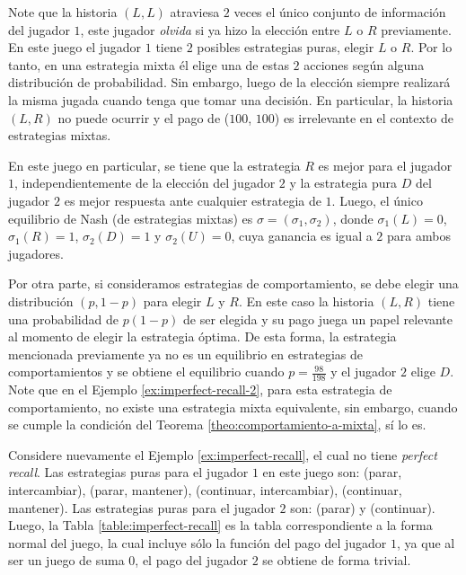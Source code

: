 Note que la historia $(L, L)$ atraviesa $2$ veces el único conjunto de información del jugador $1$, este jugador \textit{olvida} si ya hizo la elección entre $L$ o $R$ previamente. En este juego el jugador $1$ tiene $2$ posibles estrategias puras, elegir $L$ o $R$. Por lo tanto, en una estrategia mixta él elige una de estas $2$ acciones según alguna distribución de probabilidad. Sin embargo, luego de la elección siempre realizará la misma jugada cuando tenga que tomar una decisión. En particular, la historia $(L, R)$ no puede ocurrir y el pago de ($100$, $100$) es irrelevante en el contexto de estrategias mixtas.

En este juego en particular, se tiene que la estrategia $R$ es mejor para el jugador $1$, independientemente de la elección del jugador $2$ y la estrategia pura $D$ del jugador $2$ es mejor respuesta ante cualquier estrategia de $1$. Luego, el único equilibrio de Nash (de estrategias mixtas) es $ \sigma = (\sigma_1, \sigma_2)$, donde $\sigma_1(L) = 0$, $\sigma_1(R) = 1$, $\sigma_2(D) = 1$ y $\sigma_2(U) = 0$, cuya ganancia es igual a $2$ para ambos jugadores.

Por otra parte, si consideramos estrategias de comportamiento, se debe elegir una distribución $(p, 1-p)$ para elegir $L$ y $R$. En este caso la historia $(L, R)$ tiene una probabilidad de $p(1-p)$ de ser elegida y su pago juega un papel relevante al momento de elegir la estrategia óptima. De esta forma, la estrategia mencionada previamente ya no es un equilibrio en estrategias de comportamientos y se obtiene el equilibrio cuando $p = \frac{98}{198}$ y el jugador $2$ elige $D$.
Note que en el Ejemplo \ref{ex:imperfect-recall-2}, para esta estrategia de comportamiento, no existe una estrategia mixta equivalente, sin embargo, cuando se cumple la condición del Teorema \ref{theo:comportamiento-a-mixta}, sí lo es.


Considere nuevamente el Ejemplo \ref{ex:imperfect-recall}, el cual no tiene \textit{perfect recall}. Las estrategias puras para el jugador $1$ en este juego son: (parar, intercambiar), (parar, mantener), (continuar, intercambiar), (continuar, mantener). Las estrategias puras para el jugador $2$ son: (parar) y (continuar). Luego, la Tabla \ref{table:imperfect-recall} es la tabla correspondiente a la forma normal del juego, la cual incluye sólo la función del pago del jugador $1$, ya que al ser un juego de suma $0$, el pago del jugador $2$ se obtiene de forma trivial.

